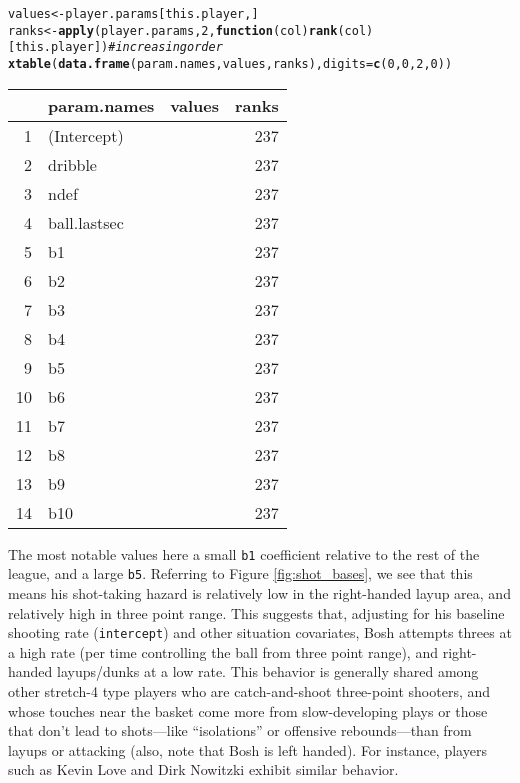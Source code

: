 \documentclass{article}\usepackage[]{graphicx}\usepackage[]{color}
\makeatletter
\newcommand{\hlnum}[1]{\textcolor[rgb]{0.686,0.059,0.569}{#1}}%
\newcommand{\hlcom}[1]{\textcolor[rgb]{0.678,0.584,0.686}{\textit{#1}}}%
\newcommand{\hlstd}[1]{\textcolor[rgb]{0.345,0.345,0.345}{#1}}%
\newcommand{\hlkwa}[1]{\textcolor[rgb]{0.161,0.373,0.58}{\textbf{#1}}}%
\newcommand{\hlkwb}[1]{\textcolor[rgb]{0.69,0.353,0.396}{#1}}%
\newcommand{\hlkwc}[1]{\textcolor[rgb]{0.333,0.667,0.333}{#1}}%
\newcommand{\hlkwd}[1]{\textcolor[rgb]{0.737,0.353,0.396}{\textbf{#1}}}%
\newenvironment{kframe}{%
 \def\at@end@of@kframe{}%
 \ifinner\ifhmode%
  \def\at@end@of@kframe{\end{minipage}}%
  \begin{minipage}{\columnwidth}%
 \fi\fi%
 \def\FrameCommand##1{\hskip\@totalleftmargin \hskip-\fboxsep
 \colorbox{shadecolor}{##1}\hskip-\fboxsep
     \hskip-\linewidth \hskip-\@totalleftmargin \hskip\columnwidth}%
 \MakeFramed {\advance\hsize-\width
   \@totalleftmargin\z@ \linewidth\hsize
   \@setminipage}}%
 {\par\unskip\endMakeFramed%
 \at@end@of@kframe}
\makeatother
\begin{document}
\begin{footnotesize}
\begin{kframe}
\begin{alltt}
\hlstd{values} \hlkwb{<-} \hlstd{player.params[this.player, ]}
\hlstd{ranks} \hlkwb{<-} \hlkwd{apply}\hlstd{(player.params,} \hlnum{2}\hlstd{,} \hlkwa{function}\hlstd{(}\hlkwc{col}\hlstd{)} \hlkwd{rank}\hlstd{(col)[this.player])} \hlcom{# increasing order}
\hlkwd{xtable}\hlstd{(}\hlkwd{data.frame}\hlstd{(param.names, values, ranks),} \hlkwc{digits}\hlstd{=}\hlkwd{c}\hlstd{(}\hlnum{0}\hlstd{,}\hlnum{0}\hlstd{,}\hlnum{2}\hlstd{,}\hlnum{0}\hlstd{))}
\end{alltt}
\end{kframe}%
\begin{table}[ht]
\centering
\begin{tabular}{rllr}
  \hline
 & param.names & values & ranks \\ 
  \hline
1 & (Intercept) &  & 237 \\ 
  2 & dribble &  & 237 \\ 
  3 & ndef &  & 237 \\ 
  4 & ball.lastsec &  & 237 \\ 
  5 & b1 &  & 237 \\ 
  6 & b2 &  & 237 \\ 
  7 & b3 &  & 237 \\ 
  8 & b4 &  & 237 \\ 
  9 & b5 &  & 237 \\ 
  10 & b6 &  & 237 \\ 
  11 & b7 &  & 237 \\ 
  12 & b8 &  & 237 \\ 
  13 & b9 &  & 237 \\ 
  14 & b10 &  & 237 \\ 
   \hline
\end{tabular}
\end{table}

\end{footnotesize}

The most notable values here a small \texttt{b1} coefficient relative to the rest of the league, and a large \texttt{b5}. Referring to Figure \ref{fig:shot_bases}, we see that this means his shot-taking hazard is relatively low in the right-handed layup area, and relatively high in three point range. This suggests that, adjusting for his baseline shooting rate (\texttt{intercept}) and other situation covariates, Bosh attempts threes at a high rate (per time controlling the ball from three point range), and right-handed layups/dunks at a low rate. This behavior is generally shared among other stretch-4 type players who are catch-and-shoot three-point shooters, and whose touches near the basket come more from slow-developing plays or those that don't lead to shots---like ``isolations'' or offensive rebounds---than from layups or attacking (also, note that Bosh is left handed). For instance, players such as Kevin Love and Dirk Nowitzki exhibit similar behavior.
\end{document}
